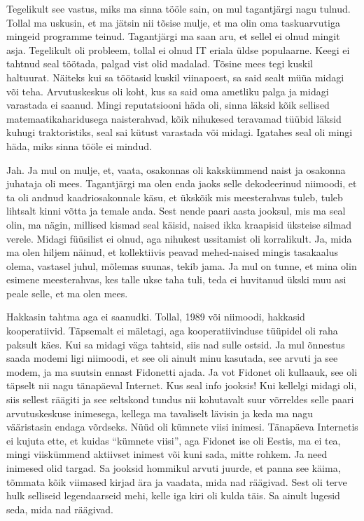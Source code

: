 
Tegelikult see vastus, miks ma sinna tööle sain, on mul tagantjärgi nagu tulnud. Tollal ma uskusin, et ma jätsin nii tõsise mulje, et ma olin oma taskuarvutiga mingeid programme teinud. Tagantjärgi ma saan aru, et sellel ei olnud mingit asja. Tegelikult oli probleem, tollal ei olnud IT eriala üldse populaarne. Keegi ei tahtnud seal töötada, palgad vist olid madalad. Tõsine mees tegi kuskil haltuurat. Näiteks kui sa töötasid kuskil viinapoest, sa said sealt müüa midagi või teha. Arvutuskeskus oli koht, kus sa said oma ametliku palga ja midagi varastada ei saanud. Mingi reputatsiooni häda oli, sinna läksid kõik sellised matemaatikaharidusega naisterahvad, kõik nihukesed teravamad tüübid läksid kuhugi traktoristiks, seal sai kütust varastada või midagi. Igatahes seal oli mingi häda, miks sinna tööle ei mindud. 


Jah. Ja mul on mulje, et, vaata, osakonnas oli kakskümmend naist ja osakonna juhataja oli mees. Tagantjärgi ma olen enda jaoks selle dekodeerinud niimoodi, et ta oli andnud kaadriosakonnale käsu, et ükskõik mis meesterahvas tuleb, tuleb lihtsalt kinni võtta ja temale anda. Sest nende paari aasta jooksul, mis ma seal olin, ma nägin, millised kismad seal käisid, naised ikka kraapisid üksteise silmad verele. Midagi füüsilist ei olnud, aga  nihukest ussitamist oli korralikult. Ja, mida ma olen hiljem näinud, et kollektiivis peavad mehed-naised mingis tasakaalus olema, vastasel juhul, mõlemas suunas, tekib jama. Ja mul on tunne, et mina olin esimene meesterahvas, kes talle ukse taha tuli, teda ei huvitanud ükski muu asi peale selle, et ma olen mees.  


Hakkasin tahtma aga ei saanudki. Tollal, 1989 või niimoodi, hakkasid kooperatiivid. Täpsemalt ei mäletagi, aga  kooperatiivinduse tüüpidel oli raha paksult käes. Kui sa  midagi väga tahtsid, siis nad sulle ostsid. Ja mul õnnestus saada modemi ligi niimoodi, et see oli ainult minu kasutada, see arvuti ja see modem, ja ma suutsin ennast Fidonetti ajada. Ja vot Fidonet oli kullaauk, see oli täpselt nii nagu tänapäeval Internet. Kus seal info jooksis! Kui kellelgi midagi oli, siis sellest räägiti ja see seltskond tundus nii kohutavalt suur võrreldes selle paari arvutuskeskuse inimesega, kellega ma tavaliselt lävisin ja keda ma nagu  vääristasin endaga võrdseks. Nüüd oli kümnete viisi inimesi. Tänapäeva Internetis ei kujuta ette, et kuidas \enquote{kümnete viisi},  aga Fidonet ise oli Eestis, ma ei tea, mingi viiskümmend aktiivset inimest või kuni sada, mitte rohkem. Ja need inimesed olid targad. Sa jooksid hommikul arvuti juurde, et panna see käima, tõmmata kõik viimased kirjad ära ja vaadata, mida nad räägivad. Sest oli terve hulk selliseid legendaarseid mehi, kelle iga kiri oli kulda täis. Sa ainult lugesid seda, mida nad räägivad. 

